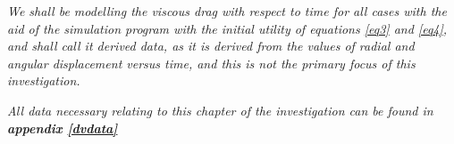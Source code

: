 \textit{We shall be modelling the viscous drag with respect to time for all cases with the aid of the simulation program with the initial utility of equations \ref{eq3} and \ref{eq4}, and shall call it derived data, as it is derived from the values of radial and angular displacement versus time, and this is not the primary focus of this investigation.}

\textit{All data necessary relating to this chapter of the investigation can be found in \textbf{appendix \ref{dvdata}}}


